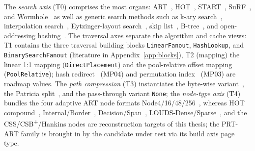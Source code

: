 \begin{nurkurz}
The \emph{search axis} (T0) comprises the most organs: ART~\cite{leis2013art}, HOT~\cite{binna2018hot},
START~\cite{fent2020start}, SuRF~\cite{zhang2018surf}, and Wormhole~\cite{wu2019wormhole} as well as generic
search methods such as k-ary search~\cite{schlegel2009kary}, interpolation search~\cite{perl1978interpolation},
Eytzinger-layout search~\cite{khuong2017eytzinger}, skip list~\cite{pugh1990skiplist},
B-tree~\cite{bayer1972btree}, and open-addressing hashing~\cite{knuth1998taocp3}. The traversal axes separate
the algorithm and cache views: T1 contains the three traversal building blocks
\texttt{Linear\allowbreak{}Fanout}, \texttt{Hash\allowbreak{}Lookup}, and
\texttt{Binary\allowbreak{}Search\allowbreak{}Fanout} (literature in Appendix~\ref{app:blocks}), T2 (mapping)
the linear 1:1 mapping (\texttt{Direct\allowbreak{}Placement}) and the pool-relative offset mapping
(\texttt{Pool\allowbreak{}Relative}); hash redirect~\cite{wu2019wormhole} (MP04) and permutation
index~\cite{mao2012masstree} (MP03) are roadmap values.
The \emph{path compression} (T3) instantiates the byte-wise variant~\cite{leis2013art}, the Patricia
split~\cite{morrison1968patricia,binna2018hot}, and the pass-through variant \texttt{None}; the
\emph{node-type axis} (T4) bundles the four adaptive ART node formats Node4/16/48/256~\cite{leis2013art},
whereas HOT compound~\cite{binna2018hot}, Internal/Border~\cite{mao2012masstree},
Decision/Span~\cite{schmeisser2022b2tree}, LOUDS-Dense/Sparse~\cite{zhang2018surf}, and the
CSS/CSB\textsuperscript{+}/Hankins nodes are reconstruction targets of this thesis; the PRT-ART family is
brought in by the candidate under test via its build axis page type.
\end{nurkurz}

